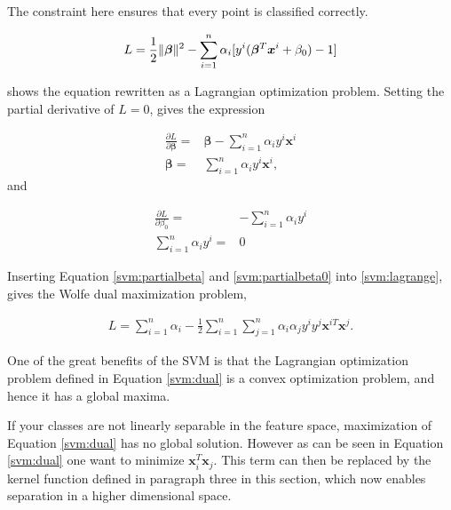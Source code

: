             The constraint here ensures that every point is classified correctly.
            
            \begin{align}
                L = \frac{1}{2}\lVert\bm \beta\rVert^2 - \sum_{i=1}^n \alpha_i[y^i(\bm \beta^T\bm x^i + \beta_0) - 1]
                \label{svm:lagrange}
            \end{align}
            
            shows the equation rewritten as a Lagrangian optimization problem. Setting the partial derivative of $L = 0$, gives the expression

            \begin{align}
                \frac{\partial L}{\partial \bm \beta} = & \bm \beta - \sum_{i=1}^n \alpha_i y^i\bm x^i \nonumber\\
                \bm \beta = & \sum_{i=1}^n \alpha_i y^i\bm x^i, 
                \label{svm:partialbeta}
            \end{align}
            and
            
            \begin{align}
                \frac{\partial L}{\partial \beta_0} =& -\sum_{i=1}^n \alpha_i y^i \nonumber   \\
                \sum_{i=1}^n \alpha_i y^i =& 0
                \label{svm:partialbeta0}
            \end{align}
            
            Inserting Equation \ref{svm:partialbeta} and \ref{svm:partialbeta0} into \ref{svm:lagrange}, gives the Wolfe dual maximization problem,
            
            \begin{align}
                L = \sum_{i=1}^n  \alpha_i - \frac{1}{2} \sum_{i=1}^n \sum_{j=1}^n \alpha_i \alpha_j y^i y^j \bm x^{iT} \bm x^j.
                \label{svm:dual}
            \end{align}
            
            One of the great benefits of the SVM is that the Lagrangian optimization problem defined in Equation \ref{svm:dual} is a convex optimization problem, and hence it has a global maxima.
            
            
            If your classes are not linearly separable in the feature space, maximization of Equation \ref{svm:dual} has no global solution. However as can be seen in Equation \ref{svm:dual} one want to minimize $\bm x_i^T  \bm x_j$. This term can then be replaced by the kernel function defined in paragraph three in this section, which now enables separation in a higher dimensional space.
            
